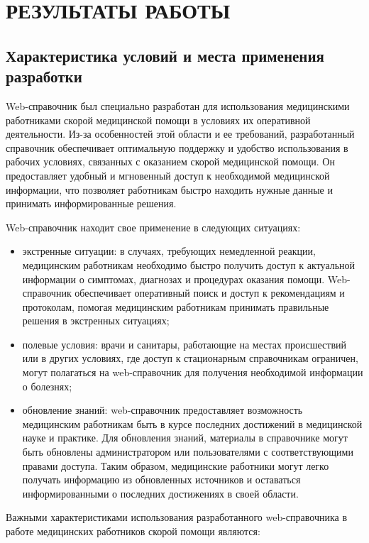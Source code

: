 \section{РЕЗУЛЬТАТЫ РАБОТЫ}

\subsection{Характеристика условий и места применения разработки}

Web-справочник был специально разработан для использования медицинскими работниками скорой медицинской помощи в условиях их оперативной деятельности. Из-за особенностей этой области и ее требований, разработанный справочник обеспечивает оптимальную поддержку и удобство использования в рабочих условиях, связанных с оказанием скорой медицинской помощи. Он предоставляет удобный и мгновенный доступ к необходимой медицинской информации, что позволяет работникам быстро находить нужные данные и принимать информированные решения.

Web-справочник находит свое применение в следующих ситуациях:

\begin{itemize}
    \item экстренные ситуации: в случаях, требующих немедленной реакции, медицинским работникам необходимо быстро получить доступ к актуальной информации о симптомах, диагнозах и процедурах оказания помощи. Web-справочник обеспечивает оперативный поиск и доступ к рекомендациям и протоколам, помогая медицинским работникам принимать правильные решения в экстренных ситуациях;
    \item полевые условия: врачи и санитары, работающие на местах происшествий или в других условиях, где доступ к стационарным справочникам ограничен, могут полагаться на web-справочник для получения необходимой информации о болезнях;
    \item обновление знаний: web-справочник предоставляет возможность медицинским работникам быть в курсе последних достижений в медицинской науке и практике. Для обновления знаний, материалы в справочнике могут быть обновлены администратором или пользователями с соответствующими правами доступа. Таким образом, медицинские работники могут легко получать информацию из обновленных источников и оставаться информированными о последних достижениях в своей области.
\end{itemize}

Важными характеристиками использования разработанного web-справочника в работе медицинских работников скорой помощи являются:

